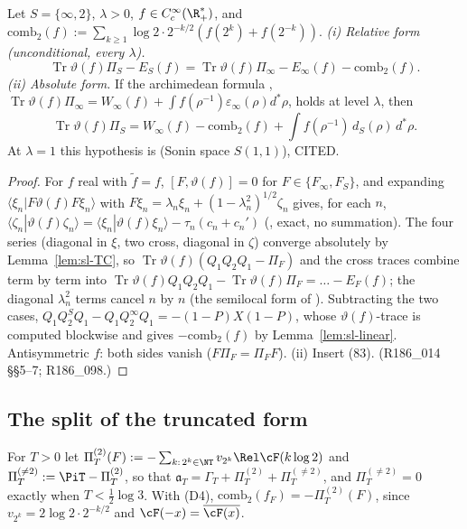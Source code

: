 \begin{theorem}\label{thm:sl-84}
Let $S=\{\infty,2\}$, $\lambda>0$, $f\in C_c^\infty(\R_+^*)$, and
$\mathrm{comb}_2(f):=\sum_{k\ge1}\log2\cdot2^{-k/2}(f(2^k)+f(2^{-k}))$.
\emph{(i) Relative form (unconditional, every $\lambda$).}
\[
\operatorname{Tr}\vartheta(f)\Pi_S-E_S(f)=\operatorname{Tr}\vartheta(f)\Pi_\infty-E_\infty(f)-\mathrm{comb}_2(f).
\]
\emph{(ii) Absolute form.} If the archimedean formula \cite[Thm.~4.7, (83)]{ConnesConsani2021},
$\operatorname{Tr}\vartheta(f)\Pi_\infty=W_\infty(f)+\int f(\rho^{-1})\varepsilon_\infty(\rho)d^*\rho$, holds at level $\lambda$, then
\[
\operatorname{Tr}\vartheta(f)\Pi_S=W_\infty(f)-\mathrm{comb}_2(f)+\int f(\rho^{-1})\,d_S(\rho)\,d^*\rho .
\]
At $\lambda=1$ this hypothesis is \cite[Thm.~4.7]{ConnesConsani2021} (Sonin space $S(1,1)$), CITED.
\end{theorem}
\begin{proof}
For $f$ real with $\tilde f=f$, $[F,\vartheta(f)]=0$ for $F\in\{F_\infty,F_S\}$, and expanding
$\langle\xi_n|F\vartheta(f)F\xi_n\rangle$ with $F\xi_n=\lambda_n\xi_n+(1-\lambda_n^2)^{1/2}\zeta_n$ gives, for each $n$,
$\langle\zeta_n|\vartheta(f)\zeta_n\rangle=\langle\xi_n|\vartheta(f)\xi_n\rangle-\tau_n(c_n+c_n')$ (\cite[(87)]{ConnesConsani2021},
exact, no summation). The four series (diagonal in $\xi$, two cross, diagonal in $\zeta$) converge absolutely by
Lemma~\ref{lem:sl-TC}, so $\operatorname{Tr}\vartheta(f)(Q_1Q_2Q_1-\Pi_F)$ and the cross traces combine term by term into
$\operatorname{Tr}\vartheta(f)Q_1Q_2Q_1-\operatorname{Tr}\vartheta(f)\Pi_F=\ldots-E_F(f)$; the diagonal $\lambda_n^2$ terms cancel
$n$ by $n$ (the semilocal form of \cite[(89)--(90)]{ConnesConsani2021}). Subtracting the two cases,
$Q_1Q_2^SQ_1-Q_1Q_2^\infty Q_1=-(1-P)X(1-P)$, whose $\vartheta(f)$-trace is computed blockwise and gives
$-\mathrm{comb}_2(f)$ by Lemma~\ref{lem:sl-linear}. Antisymmetric $f$: both sides vanish ($F\Pi_F=\Pi_FF$). (ii) Insert
(83). (R186\_014 \S\S5--7; R186\_098.)
\end{proof}

\subsection{The split of the truncated form}\label{subsec:sl-split}
For $T>0$ let $\Pi^{(2)}_T(F):=-\sum_{k:\,2^k\in\NT}v_{2^k}\Rel\cF(k\log2)$ and
$\Pi^{(\ne2)}_T:=\PiT-\Pi^{(2)}_T$, so that $\mathfrak a_T=\Gamma_T+\Pi^{(2)}_T+\Pi^{(\ne2)}_T$, and
$\Pi^{(\ne2)}_T=0$ exactly when $T<\frac12\log3$. With (D4), $\mathrm{comb}_2(f_F)=-\Pi^{(2)}_T(F)$, since
$v_{2^k}=2\log2\cdot2^{-k/2}$ and $\cF(-x)=\overline{\cF(x)}$.

